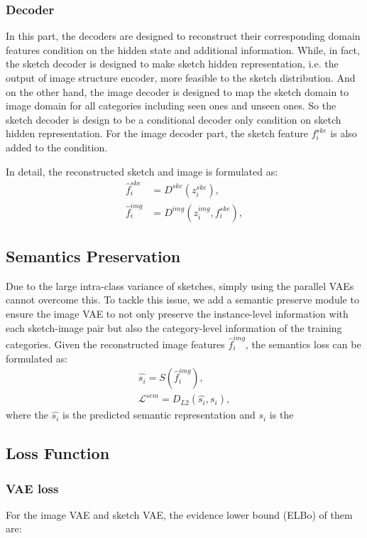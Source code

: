 \documentclass[10pt,twocolumn,letterpaper]{article}
\begin{document}
\subsubsection{Decoder}
In this part, the decoders are designed to reconstruct their corresponding domain features condition on the hidden state and additional information. While, in fact, the sketch decoder is designed to make sketch hidden representation, i.e. the output of image structure encoder, more feasible to the sketch distribution. And on the other hand, the image decoder is designed to map the sketch domain to image domain for all categories including seen ones and unseen ones.
So the sketch decoder is design to be a conditional decoder only condition on sketch hidden representation. For the image decoder part, the sketch feature $f_i^{ske}$ is also added to the condition.

In detail, the reconstructed sketch and image is formulated as:
\begin{align}
	\hat{f}_{i}^{ske} &= D^{ske}(z_{i}^{ske}), \\
	\hat{f}_{i}^{img} &= D^{img}(z_{i}^{img}, f_{i}^{ske}),
\end{align}

\subsection{Semantics Preservation} \label{3.4}
Due to the large intra-class variance of sketches, simply using the parallel VAEs cannot overcome this. To tackle this issue, we add a semantic preserve module to ensure the image VAE to not only preserve the instance-level information with each sketch-image pair but also the category-level information of the training categories.
Given the reconstructed image features $\hat{f}_{i}^{img}$, the semantics loss can be formulated as:
\begin{align}
	\hat{s_i} = S(\hat{f}_{i}^{img}), \\
	\mathcal{L}^{sem} = D_{L2}(\hat{s_i}, s_i),
\end{align}
where the $\hat{s_i}$ is the predicted semantic representation and $s_i$ is the 



\subsection{Loss Function} \label{3.5}

\subsubsection{VAE loss}
For the image VAE and sketch VAE, the evidence lower bound (ELBo) of them are:
\end{document}
